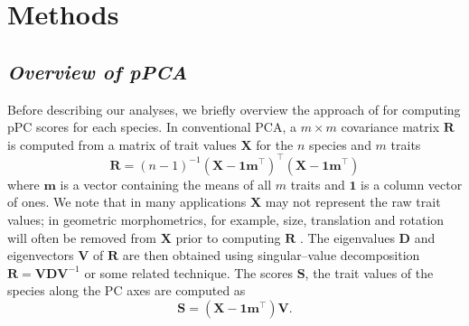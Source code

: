 \documentclass[a4paper,11pt]{article}
\begin{document}
\section{Methods}
\subsection{\emph{Overview of pPCA}}
Before describing our analyses, we briefly overview the approach of \citet{Revell2008} for computing pPC scores for each species. In conventional PCA, a $m \times m$ covariance matrix $\mathbf{R}$ is computed from a matrix of trait values $\mathbf{X}$ for the $n$ species and $m$ traits
\begin{equation}\label{eq:rpca}
\mathbf{R} = (n-1)^{-1}(\mathbf{X} - \mathbf{1m}^\intercal)^\intercal (\mathbf{X} - \mathbf{1m}^\intercal)
\end{equation}
where $\mathbf{m}$ is a vector containing the means of all $m$ traits and $\mathbf{1}$ is a column vector of ones. We note that in many applications $\mathbf{X}$ may not represent the raw trait values; in geometric morphometrics, for example, size, translation and rotation will often be removed from $\mathbf{X}$ prior to computing $\mathbf{R}$ \citep{RohlfSlice, Bookstein1997}. The eigenvalues $\mathbf{D}$ and eigenvectors $\mathbf{V}$ of $\mathbf{R}$ are then obtained using singular--value decomposition $\mathbf{R}=\mathbf{V}\mathbf{D}\mathbf{V}^{-1}$ or some related technique. The scores $\mathbf{S}$, the trait values of the species along the PC axes are computed as
\begin{equation}\label{eq:Spca}
\mathbf{S}=(\mathbf{X} - \mathbf{1m}^\intercal)\mathbf{V}.
\end{equation}
\end{document}
